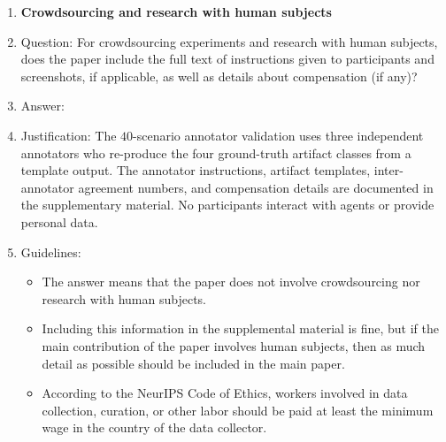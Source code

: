 \begin{enumerate}
\item {\bf Crowdsourcing and research with human subjects}
    \item[] Question: For crowdsourcing experiments and research with human subjects, does the paper include the full text of instructions given to participants and screenshots, if applicable, as well as details about compensation (if any)?
    \item[] Answer: \answerYes{}
    \item[] Justification: The $40$-scenario annotator validation uses three independent annotators who re-produce the four ground-truth artifact classes from a template output. The annotator instructions, artifact templates, inter-annotator agreement numbers, and compensation details are documented in the supplementary material. No participants interact with agents or provide personal data.
    \item[] Guidelines:
    \begin{itemize}
        \item The answer \answerNA{} means that the paper does not involve crowdsourcing nor research with human subjects.
        \item Including this information in the supplemental material is fine, but if the main contribution of the paper involves human subjects, then as much detail as possible should be included in the main paper.
        \item According to the NeurIPS Code of Ethics, workers involved in data collection, curation, or other labor should be paid at least the minimum wage in the country of the data collector.
    \end{itemize}


\end{enumerate}
